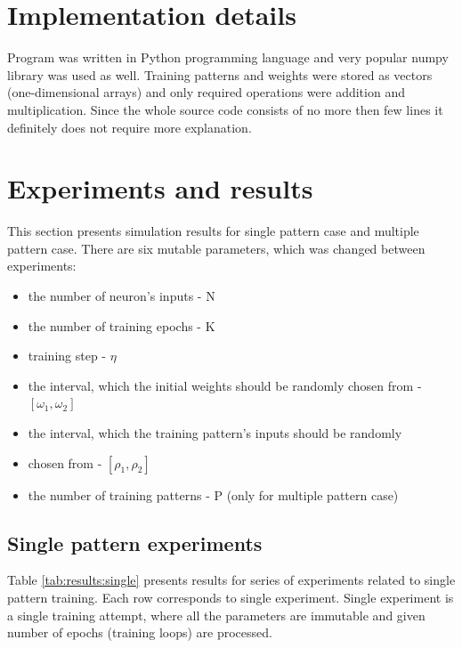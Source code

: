 \documentclass{classrep}
\begin{document}
    \section{Implementation details}
    \label{implementation} {
        Program was written in Python programming language and very popular numpy
        library was used as well. Training patterns and weights were stored as vectors
        (one-dimensional arrays) and only required operations were addition and
        multiplication. Since the whole source code consists of no more then few lines
        it definitely does not require more explanation.
    }

    \section{Experiments and results}
    \label{results} {
        This section presents simulation results for single pattern case and multiple
        pattern case. There are six mutable parameters, which was changed between
        experiments:

        \begin{itemize}
            \item the number of neuron's inputs - N
            \item the number of training epochs - K
            \item training step - $\eta$
            \item the interval, which the initial weights should be randomly chosen from -
            $[\omega_{1}, \omega_{2}]$
            \item the interval, which the training pattern's inputs should be randomly
            \item chosen
            from - $[\rho_{1}, \rho_{2}]$
            \item the number of training patterns - P (only for multiple pattern case)
        \end{itemize}

        \subsection{Single pattern experiments}
        \label{results:single} {
            Table \ref{tab:results:single} presents results for series of experiments
            related to single pattern training. Each row corresponds to single
            experiment. Single experiment is a single training attempt, where all the
            parameters are immutable and given number of epochs (training loops) are
            processed.

}}
\end{document}
